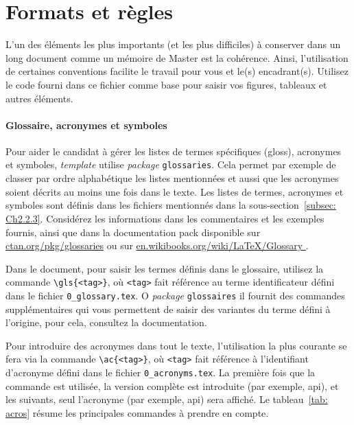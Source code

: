 
\section{Formats et règles}
L'un des éléments les plus importants (et les plus difficiles) à conserver dans un long document comme un mémoire de Master est la cohérence. Ainsi, l'utilisation de certaines conventions facilite le travail pour vous et le(s) encadrant(s). Utilisez le code fourni dans ce fichier comme base pour saisir vos figures, tableaux et autres éléments.


\paragraph{Glossaire, acronymes et symboles}

Pour aider le candidat à gérer les listes de termes spécifiques (\gls{gloss}), acronymes et symboles, \textit{template} utilise \textit{package} \verb|glossaries|. Cela permet par exemple de classer par ordre alphabétique les listes mentionnées et aussi que les acronymes soient décrits au moins une fois dans le texte. Les listes de termes, acronymes et symboles sont définis dans les fichiers mentionnés dans la sous-section~\ref{subsec: Ch2.2.3}. Considérez les informations dans les commentaires et les exemples fournis, ainsi que dans la documentation \gls{pack} disponible sur \url{ctan.org/pkg/glossaries} ou sur \url{en.wikibooks.org/wiki/LaTeX/Glossary }.

Dans le document, pour saisir les termes définis dans le glossaire, utilisez la commande \verb|\gls{<tag>}|, où \verb|<tag>| fait référence au terme identificateur défini dans le fichier \verb|0_glossary.tex|. O \textit{package} \verb|glossaires| il fournit des commandes supplémentaires qui vous permettent de saisir des variantes du terme défini à l'origine, pour cela, consultez la documentation.

Pour introduire des acronymes dans tout le texte, l'utilisation la plus courante se fera via la commande \verb|\ac{<tag>}|, où \verb|<tag>| fait référence à l'identifiant d'acronyme défini dans le fichier \verb|0_acronyms.tex|. La première fois que la commande est utilisée, la version complète est introduite (par exemple, \ac{api}), et les suivants, seul l'acronyme (par exemple, \ac{api}) sera affiché. Le tableau~\ref{tab: acros} résume les principales commandes à prendre en compte.

